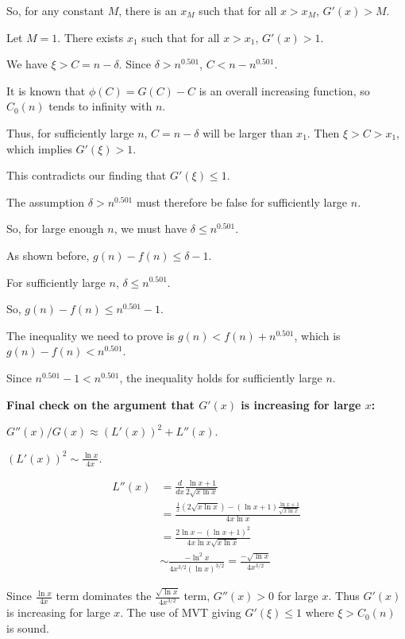 \documentclass[12pt,a4paper]{article}
\theoremstyle{definition}
\begin{document}
        So, for any constant $M$, there is an $x_M$ such that for all $x>x_M$, $G'(x)>M$.

        Let $M=1$. There exists $x_1$ such that for all $x > x_1$, $G'(x) > 1$.

        We have $\xi > C = n-\delta$. Since $\delta > n^{0.501}$, $C < n-n^{0.501}$.

        It is known that $\phi(C)=G(C)-C$ is an overall increasing function, so $C_0(n)$ tends to infinity with $n$.

        Thus, for sufficiently large $n$, $C = n-\delta$ will be larger than $x_1$. Then $\xi > C > x_1$, which implies $G'(\xi)>1$.

        This contradicts our finding that $G'(\xi) \leq 1$.

        The assumption $\delta > n^{0.501}$ must therefore be false for sufficiently large $n$.

        So, for large enough $n$, we must have $\delta \leq n^{0.501}$.

        As shown before, $g(n)-f(n) \leq \delta-1$.

        For sufficiently large $n$, $\delta \leq n^{0.501}$.

        So, $g(n)-f(n) \leq n^{0.501}-1$.

        The inequality we need to prove is $g(n) < f(n) + n^{0.501}$, which is $g(n)-f(n) < n^{0.501}$.

        Since $n^{0.501}-1 < n^{0.501}$, the inequality holds for sufficiently large $n$.

        \textbf{Final check on the argument that $G'(x)$ is increasing for large $x$:}

        $G''(x)/G(x) \approx (L'(x))^2 + L''(x)$.

        $(L'(x))^2 \sim \frac{\ln x}{4x}$.

        \begin{align}
            L''(x) &= \frac{d}{dx} \frac{\ln x+1}{2\sqrt{x\ln x}}\\
            &= \frac{\frac{1}{x}(2\sqrt{x\ln x}) - (\ln x+1)\frac{\ln x+1}{\sqrt{x\ln x}}}{4x\ln x}\\
            &= \frac{2\ln x - (\ln x+1)^2}{4x\ln x \sqrt{x\ln x}}\\
            &\sim \frac{-\ln^2 x}{4x^{3/2}(\ln x)^{3/2}} = \frac{-\sqrt{\ln x}}{4x^{3/2}}
        \end{align}

        Since $\frac{\ln x}{4x}$ term dominates the $\frac{\sqrt{\ln x}}{4x^{3/2}}$ term, $G''(x)>0$ for large $x$. Thus $G'(x)$ is increasing for large $x$. The use of MVT giving $G'(\xi) \leq 1$ where $\xi > C_0(n)$ is sound.
\end{document}
